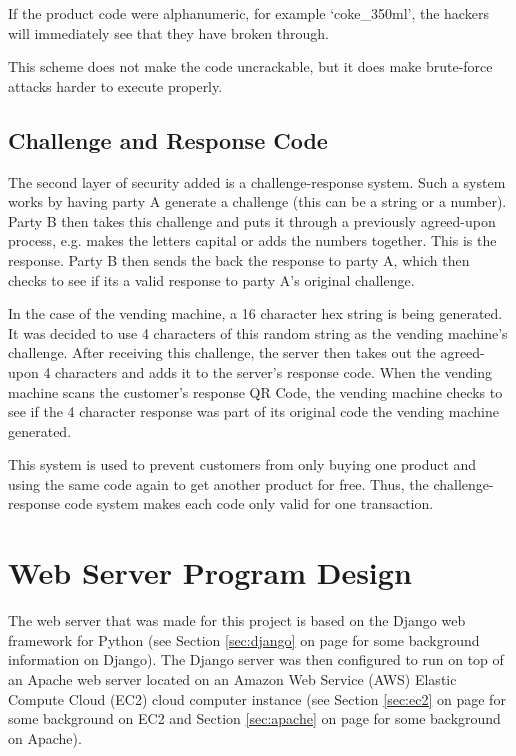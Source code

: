 If the product code were alphanumeric, for example `coke_350ml', the hackers
will immediately see that they have broken through.

This scheme does not make the code uncrackable, but it does make brute-force
attacks harder to execute properly.

\subsection{Challenge and Response Code}

The second layer of security added is a challenge-response system. Such a system
works by having party A generate a challenge (this can be a string or a number).
Party B then takes this challenge and puts it through a previously agreed-upon
process, e.g. makes the letters capital or adds the numbers together. This
is the response. Party B then sends the back the response to party A, which then
checks to see if its a valid response to party A's original challenge.

In the case of the vending machine, a 16 character hex string is being
generated. It was decided to use 4 characters of this random string as the
vending machine's challenge. After receiving this challenge, the server then
takes out the agreed-upon 4 characters and adds it to the server's response
code. When the vending machine scans the customer's response QR Code, the
vending machine checks to see if the 4 character response was part of its
original code the vending machine generated.

This system is used to prevent customers from only buying one product and using
the same code again to get another product for free. Thus, the
challenge-response code system makes each code only valid for one transaction.

\section{Web Server Program Design}

The web server that was made for this project is based on the Django web framework for Python
(see Section \ref{sec:django} on page \pageref{sec:django} for some background
information on Django). The Django server was then configured to run on top of
an Apache web server located on an Amazon Web Service (AWS) Elastic Compute
Cloud (EC2) cloud computer instance (see Section \ref{sec:ec2} on page
\pageref{sec:ec2} for some background on EC2 and Section \ref{sec:apache} on
page \pageref{sec:apache} for some background on Apache).

